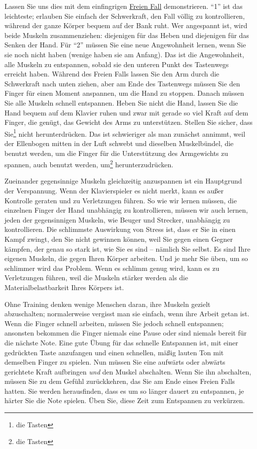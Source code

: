 Lassen Sie uns dies mit dem einfingrigen \hyperref[c1ii10]{Freien Fall} demonstrieren.
\enquote{1} ist das leichteste; erlauben Sie einfach der Schwerkraft, den Fall völlig zu kontrollieren, während der ganze Körper bequem auf der Bank ruht.
Wer angespannt ist, wird beide Muskeln zusammenziehen: diejenigen für das Heben und diejenigen für das Senken der Hand.
Für \enquote{2} müssen Sie eine neue Angewohnheit lernen, wenn Sie sie noch nicht haben (wenige haben sie am Anfang).
Das ist die Angewohnheit, alle Muskeln zu entspannen, sobald sie den unteren Punkt des Tastenwegs erreicht haben.
Während des Freien Falls lassen Sie den Arm durch die Schwerkraft nach unten ziehen, aber am Ende des Tastenwegs müssen Sie den Finger für einen Moment anspannen, um die Hand zu stoppen.
Danach müssen Sie alle Muskeln schnell entspannen.
Heben Sie nicht die Hand, lassen Sie die Hand bequem auf dem Klavier ruhen und zwar mit gerade so viel Kraft auf dem Finger, die genügt, das Gewicht des Arms zu unterstützen.
Stellen Sie sicher, dass Sie\footnote{die Tasten} nicht herunterdrücken.
Das ist schwieriger als man zunächst annimmt, weil der Ellenbogen mitten in der Luft schwebt und dieselben Muskelbündel, die benutzt werden, um die Finger für die Unterstützung des Armgewichts zu spannen, auch benutzt werden, um\footnote{die Tasten} herunterzudrücken.

Zueinander gegensinnige Muskeln gleichzeitig anzuspannen ist ein Hauptgrund der Verspannung.
Wenn der Klavierspieler es nicht merkt, kann es außer Kontrolle geraten und zu Verletzungen führen.
So wie wir lernen müssen, die einzelnen Finger der Hand unabhängig zu kontrollieren, müssen wir auch lernen, jeden der gegensinnigen Muskeln, wie Beuger und Strecker, unabhängig zu kontrollieren.
Die schlimmste Auswirkung von Stress ist, dass er Sie in einen Kampf zwingt, den Sie nicht gewinnen können, weil Sie gegen einen Gegner kämpfen, der genau so stark ist, wie Sie es sind -- nämlich Sie selbst.
Es sind Ihre eigenen Muskeln, die gegen Ihren Körper arbeiten. 
Und je mehr Sie üben, um so schlimmer wird das Problem.
Wenn es schlimm genug wird, kann es zu Verletzungen führen, weil die Muskeln stärker werden als die Materialbelastbarkeit Ihres Körpers ist.

Ohne Training denken wenige Menschen daran, ihre Muskeln gezielt abzuschalten; normalerweise vergisst man sie einfach, wenn ihre Arbeit getan ist.
Wenn die Finger schnell arbeiten, müssen Sie jedoch schnell entspannen; ansonsten bekommen die Finger niemals eine Pause oder sind niemals bereit für die nächste Note.
Eine gute Übung für das schnelle Entspannen ist, mit einer gedrückten Taste anzufangen und einen schnellen, mäßig lauten Ton mit demselben Finger zu spielen.
Nun müssen Sie eine aufwärts oder abwärts gerichtete Kraft aufbringen \textit{und} den Muskel abschalten.
Wenn Sie ihn abschalten, müssen Sie zu dem Gefühl zurückkehren, das Sie am Ende eines Freien Falls hatten.
Sie werden herausfinden, dass es um so länger dauert zu entspannen, je härter Sie die Note spielen.
Üben Sie, diese Zeit zum Entspannen zu verkürzen.

